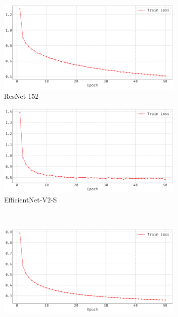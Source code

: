 \documentclass{article}
\begin{document}
\begin{figure}
    \centering
    \begin{subfigure}{0.45\linewidth}
        \centering
    	\includegraphics[width=\linewidth]{figs/loss_curves_2_resnet152.pdf}     
    	\caption{ResNet-152}
    	\label{fig:curve-resnet}
    \end{subfigure}
    \hfill
    \begin{subfigure}{0.45\linewidth}
        \centering
    	\includegraphics[width=\linewidth]{figs/loss_curves_3_efficientnet_v2_s.pdf}
    	\caption{EfficientNet-V2-S}
    	\label{fig:curve-efficientnet}
    \end{subfigure}
    \\[1.5em]
    \begin{subfigure}{0.45\linewidth}
        \centering
    	\includegraphics[width=\linewidth]{figs/loss_curves_1_vit_b_16.pdf}     

\end{subfigure}
\end{figure}
\end{document}
